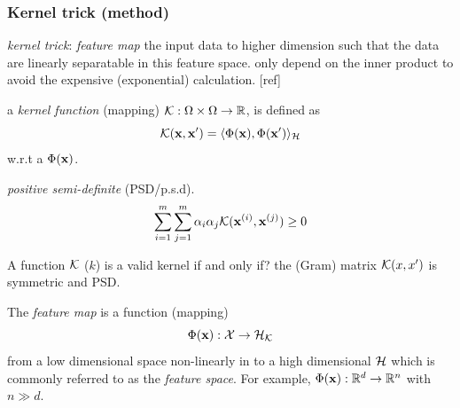 \subsubsection{Kernel trick (method)}
\emph{kernel trick}: \emph{feature map} the input data to higher dimension such that the data are linearly separatable in this feature space.
only depend on the inner product to avoid the expensive (exponential) calculation. [ref]
\begin{definition}\label{def:kernel}
	a \emph{kernel function} (mapping) $\mathcal{K}: \Omega\times\Omega\to\mathbb{R}$,
	is defined as 
	\begin{equation}
		\mathcal{K}(\vb{x},\vb{x}') = \langle \Phi(\vb{x}),\Phi(\vb{x}') \rangle_{\mathcal{H}}
		\label{eq:kernel_classical}
	\end{equation}
	w.r.t a  $\Phi(\vb{x})$.
\end{definition}
\begin{definition}\label{def:psd}
	\emph{positive semi-definite} (PSD/p.s.d).	
	\begin{equation}
		\sum_{i=1}^m \sum_{j=1}^m \alpha_i\alpha_j \mathcal{K}(\vb{x}^{(i)},\vb{x}^{(j)}) \ge 0
	\end{equation}
\end{definition}
\begin{remark}
	A function $\mathcal{K}$ ($k$) is a valid kernel if and only if? the (Gram) matrix $\mathcal{K}(x,x')$ is symmetric and PSD.
\end{remark}
\begin{definition}\label{def:feature_map_classical}
	The \emph{feature map} is a function (mapping)
	\begin{equation}
		\Phi(\vb{x}) : \mathcal{X} \to \mathcal{H}_{\mathcal{K}}
		\label{eq:feature_map_classical}
	\end{equation}
	from a low dimensional space non-linearly in to a high dimensional  $\mathcal{H}$ which is commonly referred to as the \emph{feature space}.
	For example, $\Phi(\vb{x}):\mathbb{R}^d \to \mathbb{R}^n$ with $n\gg d$.
\end{definition}
